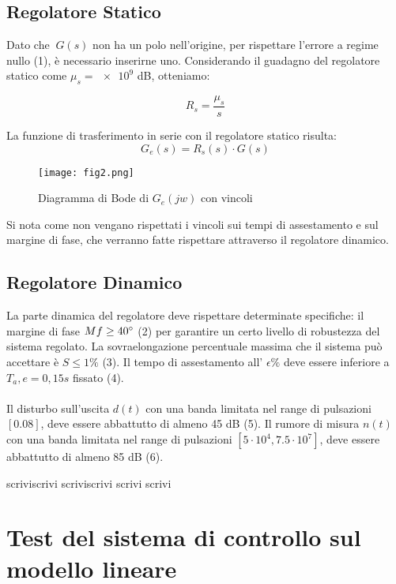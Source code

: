 \documentclass{article}
\begin{document}
\subsection{Regolatore Statico}

Dato che $\ G(s)$ non ha un polo nell'origine, per rispettare l'errore a regime nullo (1), è necessario inserirne uno. Considerando il guadagno del regolatore statico come  $ \mu_s =\num{e9}$ dB, otteniamo:

\[ R_s = \frac{\mu_s}{s}  \]


La funzione di trasferimento in serie con il regolatore statico risulta:
\[ G_e(s) = R_s(s) \cdot G(s) \]

\begin{figure}[!h]
\centering
\texttt{[image: fig2.png]}
\caption{\label{fig:orbit}Diagramma di Bode di $G_e(jw)$ con vincoli}
\end{figure}

Si nota come non vengano rispettati i vincoli sui tempi di assestamento e sul margine di fase, che verranno fatte rispettare attraverso il regolatore dinamico.


\subsection{Regolatore Dinamico}
 La parte dinamica del regolatore deve rispettare determinate specifiche: il margine di fase $ Mf \geq 40\degree $ (2) per garantire un certo livello di robustezza del sistema regolato. 
La sovraelongazione percentuale massima che il sistema può accettare è $ S \leq 1\% $ (3). Il tempo di assestamento all' $ \epsilon\% $ deve essere inferiore a $ T_a,e=0,15s $ fissato (4).\\\\ Il disturbo sull'uscita $ d(t)$ con una banda limitata nel range di pulsazioni $[0.08]$, deve
essere abbattutto di almeno 45 dB (5).
Il rumore di misura $ n(t)$ con una banda limitata nel range di pulsazioni $[5\cdot10^4, 7.5\cdot10^7]$, deve
essere abbattutto di almeno 85 dB (6).

scriviscrivi
scriviscrivi
scrivi
scrivi

\section{Test del sistema di controllo sul modello lineare}
\end{document}
